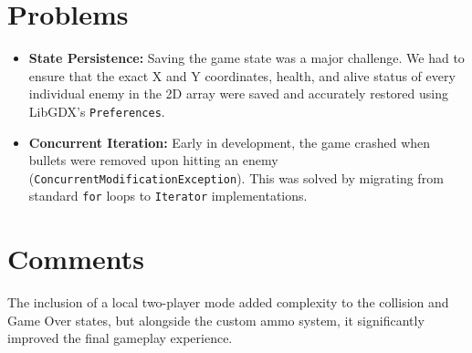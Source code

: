 \documentclass[12pt, a4paper]{article}
\begin{document}
\section{Problems}
\begin{itemize}
    \item \textbf{State Persistence:} Saving the game state was a major challenge. We had to ensure that the exact X and Y coordinates, health, and alive status of every individual enemy in the 2D array were saved and accurately restored using LibGDX's \texttt{Preferences}.
    \item \textbf{Concurrent Iteration:} Early in development, the game crashed when bullets were removed upon hitting an enemy (\texttt{ConcurrentModificationException}). This was solved by migrating from standard \texttt{for} loops to \texttt{Iterator} implementations.
\end{itemize}

\section{Comments}
The inclusion of a local two-player mode added complexity to the collision and Game Over states, but alongside the custom ammo system, it significantly improved the final gameplay experience. 
\end{document}
